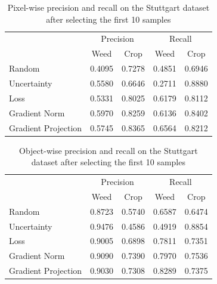 \documentclass[letterpaper, 10 pt, conference]{ieeeconf}  %
\begin{document}
       \begin{table}
        \centering
        \caption{Pixel-wise precision and recall on the Stuttgart dataset after selecting the first 10 samples}
        \begin{tabular}{@{}lcccc@{}} 
            \toprule
            & \multicolumn{2}{c}{Precision} & \multicolumn{2}{c}{Recall}\\ 
           \cmidrule{2-5} 
               & Weed & Crop & Weed & Crop \\ 
            \midrule 
    		  Random & 0.4095 & 0.7278 & 0.4851 & 0.6946  \\ \addlinespace
    		  Uncertainty & 0.5580 & 0.6646 & 0.2711 & 0.8880  \\ \addlinespace
    		  Loss & 0.5331 & 0.8025 & 0.6179 & 0.8112  \\ \addlinespace
    		  Gradient Norm & 0.5970 & 0.8259 & 0.6136 & 0.8402  \\ \addlinespace
    		  Gradient Projection & 0.5745 & 0.8365 & 0.6564 & 0.8212  \\ 
            \bottomrule
        \end{tabular}
        \label{tab:pixel_wise_10_stuttgart}
    \end{table}
   
   
   
   
          \begin{table}
        \centering
        \caption{Object-wise precision and recall on the Stuttgart dataset after selecting the first 10 samples}
        \begin{tabular}{@{}lcccc@{}} 
            \toprule
            & \multicolumn{2}{c}{Precision} & \multicolumn{2}{c}{Recall}\\ 
           \cmidrule{2-5} 
               & Weed & Crop & Weed & Crop \\ 
            \midrule 
    		  Random & 0.8723 & 0.5740 & 0.6587 & 0.6474  \\ \addlinespace
    		  Uncertainty & 0.9476 & 0.4586 & 0.4919 & 0.8854  \\ \addlinespace
    		  Loss & 0.9005 & 0.6898 & 0.7811 & 0.7351  \\ \addlinespace
    		  Gradient Norm & 0.9090 & 0.7390 & 0.7970 & 0.7536  \\ \addlinespace
    		  Gradient Projection & 0.9030 & 0.7308 & 0.8289 & 0.7375  \\ 
            \bottomrule
        \end{tabular}
        \label{tab:object_wise_10_stuttgart}
    \end{table}
   
\end{document}

